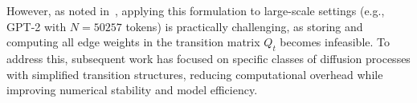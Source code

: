   However, as noted in~\citep{lou2024discrete}, applying this formulation to large-scale settings (e.g., GPT-2 with $N = 50257$ tokens) is practically challenging, as storing and computing all edge weights in the transition matrix $Q_t$ becomes infeasible. To address this, subsequent work has focused on specific classes of diffusion processes with simplified transition structures, reducing computational overhead while improving numerical stability and model efficiency.


